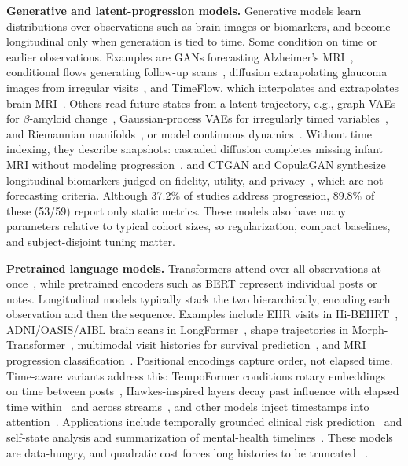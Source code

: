 \documentclass[11pt]{article}
\theoremstyle{plain}
\theoremstyle{definition}
\theoremstyle{remark}
\begin{document}
\noindent\textbf{Generative and latent-progression models.} Generative models learn distributions over observations such as brain images or biomarkers, and become longitudinal only when generation is tied to time. Some condition on time or earlier observations. Examples are GANs forecasting Alzheimer's MRI~\citep{10489807}, conditional flows generating follow-up scans~\citep{9008303}, diffusion extrapolating glaucoma images from irregular visits~\citep{10822368}, and TimeFlow, which interpolates and extrapolates brain MRI~\citep{11437527}. Others read future states from a latent trajectory, e.g., graph VAEs for $\beta$-amyloid change~\citep{9761588}, Gaussian-process VAEs for irregularly timed variables~\citep{10069449}, and Riemannian manifolds~\citep{9761641}, or model continuous dynamics~\citep{9098571,10890535}. Without time indexing, they describe snapshots: cascaded diffusion completes missing infant MRI without modeling progression~\citep{10635663}, and CTGAN and CopulaGAN synthesize longitudinal biomarkers judged on fidelity, utility, and privacy~\citep{11563433}, which are not forecasting criteria. Although 37.2\% of studies address progression, 89.8\% of these (53/59) report only static metrics. These models also have many parameters relative to typical cohort sizes, so regularization, compact baselines, and subject-disjoint tuning matter.

\noindent\textbf{Pretrained language models.} Transformers attend over all observations at once~\citep{vaswani2023attentionneed}, while pretrained encoders such as BERT represent individual posts or notes. Longitudinal models typically stack the two hierarchically, encoding each observation and then the sequence. Examples include EHR visits in Hi-BEHRT~\citep{li2022hi}, ADNI/OASIS/AIBL brain scans in LongFormer~\citep{10483639}, shape trajectories in Morph-Transformer~\citep{10635519}, multimodal visit histories for survival prediction~\citep{11373479}, and MRI progression classification~\citep{10969769}. Positional encodings capture order, not elapsed time. Time-aware variants address this: TempoFormer conditions rotary embeddings~\citep{su2024roformer} on time between posts~\citep{tseriotou2024tempoformer}, Hawkes-inspired layers decay past influence with elapsed time within~\citep{hills2024exciting} and across streams~\citep{hills-etal-2026-multistream}, and other models inject timestamps into attention~\citep{rosin2022temporalattentionlanguagemodels,zhang2025chronoformer}. Applications include temporally grounded clinical risk prediction~\citep{chaturvedi-etal-2026-early} and self-state analysis and summarization of mental-health timelines~\citep{b-v-patil-2025-transformer}. These models are data-hungry, and quadratic cost forces long histories to be truncated ~\citep{beltagy2020longformer,zaheer2020big}.
\end{document}
